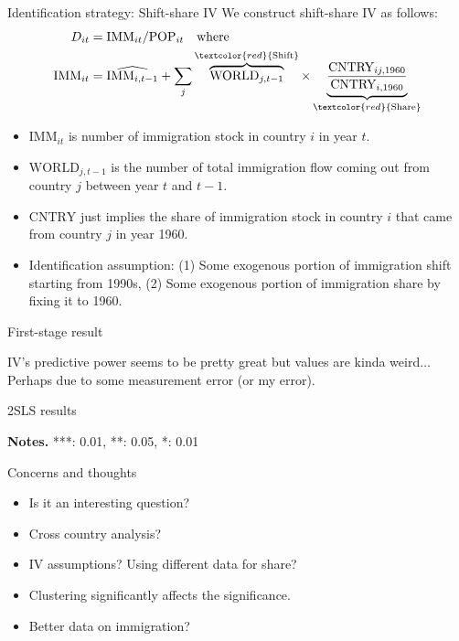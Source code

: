\documentclass[notes,11pt, aspectratio=169]{beamer}
\begin{document}
\begin{frame}{Identification strategy: Shift-share IV}
	We construct shift-share IV as follows:
	\begin{align*}
		D_{it} &= \text{IMM}_{it} / \text{POP}_{it} \quad \text{where}\\ \nonumber  
		\text{IMM}_{it}  &= \widehat{\text{IMM}_{i,t-1}} +  \sum_j \overbrace{\text{WORLD}_{j,t-1}}^{\textcolor{red}{\text{Shift}}} \times \underbrace{\frac{\text{CNTRY}_{ij, 1960}}{\text{CNTRY}_{i,1960}}}_{\textcolor{red}{\text{Share}}}	
	\end{align*}

	\begin{itemize}
		\item $\text{IMM}_{it}$ is number of immigration stock in country $i$ in year $t$.
		\item $\text{WORLD}_{j,t-1}$ is the number of total immigration flow  coming out from country $j$ between year $t$ and $t-1$.
		\item $\text{CNTRY}$ just implies the share of immigration stock in country $i$ that came from country $j$ in year 1960.
		\item Identification assumption: (1) Some exogenous portion of immigration shift starting from 1990s, (2) Some exogenous portion of immigration share by fixing it to 1960.
	\end{itemize}
\end{frame}

\begin{frame}{First-stage result}
	\begin{figure}
	\end{figure}	
	IV's predictive power seems to be pretty great but values are kinda weird$\ldots$ Perhaps due to some measurement error (or my error).
\end{frame}

\begin{frame}{2SLS results}
\begin{table}
	\resizebox{0.8\textwidth}{!}{
	}
\end{table}	
\begin{footnotesize}
	\textbf{Notes.} ***: 0.01, **: 0.05, *: 0.01
\end{footnotesize}
\end{frame}

\begin{frame}{Concerns and thoughts}
\begin{itemize}
	\item Is it an interesting question?
	\item Cross country analysis?
	\item IV assumptions? Using different data for share?
	\item Clustering significantly affects the significance.
	\item Better data on immigration?
\end{itemize}	
\end{frame}
\end{document}
